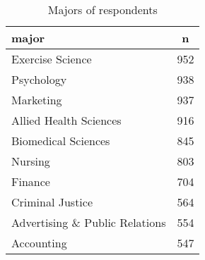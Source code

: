 \documentclass{article}
\begin{document}
\begin{table}[ht]
\centering
\begin{tabular}{lc}
  \hline
  major & n \\ 
  \hline
  Exercise Science & 952 \\ 
  Psychology & 938 \\ 
  Marketing & 937 \\ 
  Allied Health Sciences & 916 \\ 
  Biomedical Sciences & 845 \\ 
  Nursing & 803 \\ 
  Finance & 704 \\ 
  Criminal Justice & 564 \\ 
  Advertising \& Public Relations & 554 \\ 
  Accounting & 547 \\ 
   \hline
\end{tabular}
\caption*{Majors of respondents} 
\end{table}
\end{document}
